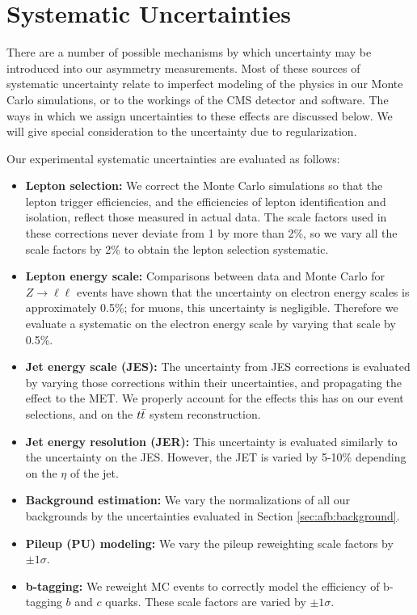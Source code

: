 
\section{Systematic Uncertainties}
\label{sec:afb:systematics}

There are a number of possible mechanisms by which uncertainty may be
introduced into our asymmetry measurements. Most of these sources of
systematic uncertainty relate to imperfect modeling of the physics in our Monte
Carlo simulations, or to the workings of the CMS detector and
software. The ways in which we assign uncertainties
to these effects are discussed below. We will give special
consideration to the uncertainty due to regularization.

Our experimental systematic uncertainties are evaluated as follows:

\begin{itemize}
\item \textbf{Lepton selection:} We correct the Monte Carlo
  simulations so that the lepton trigger efficiencies, and the
  efficiencies of lepton identification and isolation, reflect those
  measured in actual data. The scale factors used in these corrections
  never deviate from 1 by more than 2\%, so we vary all the scale
  factors by 2\% to obtain the lepton selection systematic.
\item \textbf{Lepton energy scale:} Comparisons between data and Monte
  Carlo for $Z \rightarrow \ell\ell$ events have shown that the
  uncertainty on electron energy scales is approximately 0.5\%; for
  muons, this uncertainty is negligible. Therefore we evaluate a
  systematic on the electron energy scale by varying that scale by
  0.5\%.
\item \textbf{Jet energy scale (JES):} The uncertainty from JES
  corrections is evaluated by varying those corrections within their
  uncertainties, and propagating the effect to the MET. We properly
  account for the effects this has on our event selections, and on the
  $t\bar{t}$ system reconstruction.
\item \textbf{Jet energy resolution (JER):} This uncertainty is
  evaluated similarly to the uncertainty on the JES. However, the JET
  is varied by 5-10\% depending on the $\eta$ of the jet.
\item \textbf{Background estimation:} We vary the normalizations of
  all our backgrounds by the uncertainties evaluated in Section
  \ref{sec:afb:background}.
\item \textbf{Pileup (PU) modeling:} We vary the pileup reweighting
  scale factors by $\pm 1 \sigma$.
\item \textbf{b-tagging:} We reweight MC events to correctly model the
  efficiency of b-tagging $b$ and $c$ quarks. These scale factors are
  varied by $\pm 1 \sigma$.
\end{itemize}


